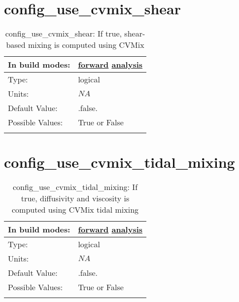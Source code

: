 \section[config\_use\_cvmix\_shear]{config\_use\_cvmix\_shear}
\label{sec:nm_sec_config_use_cvmix_shear}
\begin{center}
\begin{longtable}{| p{2.0in} || p{4.0in} |}
    \hline
    In build modes: & \hyperref[subsec:forward_nm_tab_cvmix]{forward} \hyperref[subsec:analysis_nm_tab_cvmix]{analysis} \\
    \hline
    Type: & logical \\
    \hline
    Units: & $NA$ \\
    \hline
    Default Value: & .false. \\
    \hline
    Possible Values: & True or False \\
    \hline
    \caption{config\_use\_cvmix\_shear: If true, shear-based mixing is computed using CVMix}
\end{longtable}
\end{center}
\section[config\_use\_cvmix\_tidal\_mixing]{config\_use\_cvmix\_tidal\_mixing}
\label{sec:nm_sec_config_use_cvmix_tidal_mixing}
\begin{center}
\begin{longtable}{| p{2.0in} || p{4.0in} |}
    \hline
    In build modes: & \hyperref[subsec:forward_nm_tab_cvmix]{forward} \hyperref[subsec:analysis_nm_tab_cvmix]{analysis} \\
    \hline
    Type: & logical \\
    \hline
    Units: & $NA$ \\
    \hline
    Default Value: & .false. \\
    \hline
    Possible Values: & True or False \\
    \hline
    \caption{config\_use\_cvmix\_tidal\_mixing: If true, diffusivity and viscosity is computed using CVMix tidal mixing}
\end{longtable}
\end{center}
